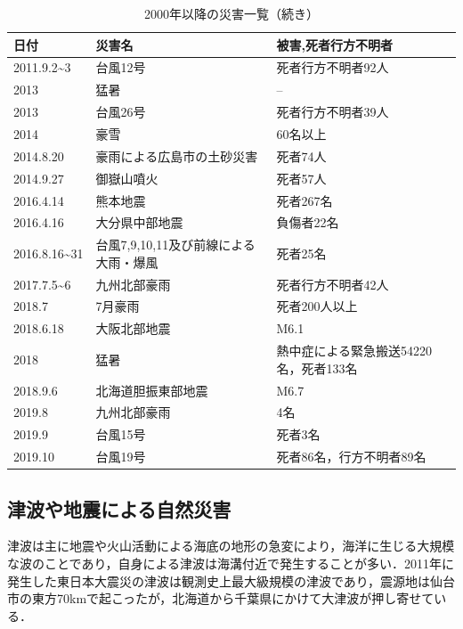 \documentclass[a4j,11pt]{jsarticle}
\begin{document}
\begin{table}[htb]
  \begin{center} 
    \caption{2000年以降の災害一覧（続き）}
    \label{tab:saigai2}
    \begin{tabular}{|p{8em}|p{15em}|p{15em}|} \hline
    日付 & 災害名 & 被害,死者行方不明者\\ \hline \hline
       
      2011.9.2\textasciitilde3 & 台風12号& 死者行方不明者92人\\ \hline
      2013 & 猛暑&--\\ \hline
      2013 & 台風26号& 死者行方不明者39人\\ \hline
      2014 & 豪雪& 60名以上 \\ \hline
      2014.8.20 & 豪雨による広島市の土砂災害& 死者74人\\ \hline
      2014.9.27 & 御嶽山噴火& 死者57人\\ \hline
      2016.4.14 & 熊本地震& 死者267名\\ \hline
      2016.4.16 & 大分県中部地震& 負傷者22名\\ \hline
      2016.8.16\textasciitilde31 & 台風7,9,10,11及び前線による大雨・爆風&死者25名\\ \hline
      2017.7.5\textasciitilde6 & 九州北部豪雨&死者行方不明者42人\\ \hline
      2018.7 & 7月豪雨& 死者200人以上\\ \hline
      2018.6.18 & 大阪北部地震& M6.1\\ \hline
      2018 & 猛暑& 熱中症による緊急搬送54220名，死者133名\\ \hline
      2018.9.6 & 北海道胆振東部地震& M6.7\\ \hline
      2019.8 & 九州北部豪雨& 4名\\ \hline
      2019.9 & 台風15号& 死者3名\\ \hline
      2019.10 & 台風19号& 死者86名，行方不明者89名\\ \hline
    \end{tabular}
  \end{center}
\end{table}


\newpage

\subsection{津波や地震による自然災害}
津波は主に地震や火山活動による海底の地形の急変により，海洋に生じる大規模な波のことであり，自身による津波は海溝付近で発生することが多い．2011年に発生した東日本大震災の津波は観測史上最大級規模の津波であり，震源地は仙台市の東方70kmで起こったが，北海道から千葉県にかけて大津波が押し寄せている．
\end{document}
